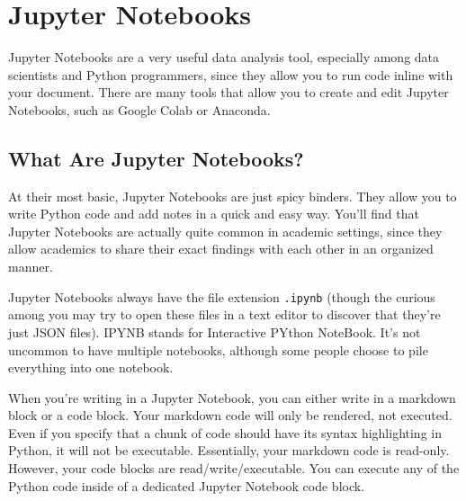 \chapter{Jupyter Notebooks}
Jupyter Notebooks are a very useful data analysis tool, especially among data scientists and Python programmers, since they allow you to run code inline with your document. There are many tools that allow you to create and edit Jupyter Notebooks, such as Google Colab or Anaconda.\par
\section{What Are Jupyter Notebooks?}
At their most basic, Jupyter Notebooks are just spicy binders. They allow you to write Python code and add notes in a quick and easy way. You'll find that Jupyter Notebooks are actually quite common in academic settings, since they allow academics to share their exact findings with each other in an organized manner. \par
Jupyter Notebooks always have the file extension \verb|.ipynb| (though the curious among you may try to open these files in a text editor to discover that they're just JSON files). IPYNB stands for Interactive PYthon NoteBook. It's not uncommon to have multiple notebooks, although some people choose to pile everything into one notebook.\par
When you're writing in a Jupyter Notebook, you can either write in a markdown block or a code block. Your markdown code will only be rendered, not executed. Even if you specify that a chunk of code should have its syntax highlighting in Python, it will not be executable. Essentially, your markdown code is read-only. However, your code blocks are read/write/executable. You can execute any of the Python code inside of a dedicated Jupyter Notebook code block.\par
